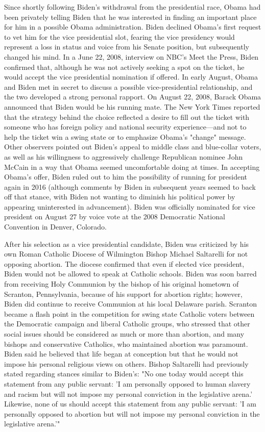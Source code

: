 Since shortly following Biden's withdrawal from the presidential race,
Obama had been privately telling Biden that he was interested in finding
an important place for him in a possible Obama administration. Biden
declined Obama's first request to vet him for the vice presidential
slot, fearing the vice presidency would represent a loss in status and
voice from his Senate position, but subsequently changed his mind. In a
June 22, 2008, interview on NBC's Meet the Press, Biden confirmed that,
although he was not actively seeking a spot on the ticket, he would
accept the vice presidential nomination if offered. In early August,
Obama and Biden met in secret to discuss a possible vice-presidential
relationship, and the two developed a strong personal rapport. On August
22, 2008, Barack Obama announced that Biden would be his running mate.
The New York Times reported that the strategy behind the choice
reflected a desire to fill out the ticket with someone who has foreign
policy and national security experience---and not to help the ticket win
a swing state or to emphasize Obama's "change" message. Other observers
pointed out Biden's appeal to middle class and blue-collar voters, as
well as his willingness to aggressively challenge Republican nominee
John McCain in a way that Obama seemed uncomfortable doing at times. In
accepting Obama's offer, Biden ruled out to him the possibility of
running for president again in 2016 (although comments by Biden in
subsequent years seemed to back off that stance, with Biden not wanting
to diminish his political power by appearing uninterested in
advancement). Biden was officially nominated for vice president on
August 27 by voice vote at the 2008 Democratic National Convention in
Denver, Colorado.

After his selection as a vice presidential candidate, Biden was
criticized by his own Roman Catholic Diocese of Wilmington Bishop
Michael Saltarelli for not opposing abortion. The diocese confirmed that
even if elected vice president, Biden would not be allowed to speak at
Catholic schools. Biden was soon barred from receiving Holy Communion by
the bishop of his original hometown of Scranton, Pennsylvania, because
of his support for abortion rights; however, Biden did continue to
receive Communion at his local Delaware parish. Scranton became a flash
point in the competition for swing state Catholic voters between the
Democratic campaign and liberal Catholic groups, who stressed that other
social issues should be considered as much or more than abortion, and
many bishops and conservative Catholics, who maintained abortion was
paramount. Biden said he believed that life began at conception but that
he would not impose his personal religious views on others. Bishop
Saltarelli had previously stated regarding stances similar to Biden's:
"No one today would accept this statement from any public servant: 'I am
personally opposed to human slavery and racism but will not impose my
personal conviction in the legislative arena.' Likewise, none of us
should accept this statement from any public servant: 'I am personally
opposed to abortion but will not impose my personal conviction in the
legislative arena.'"

